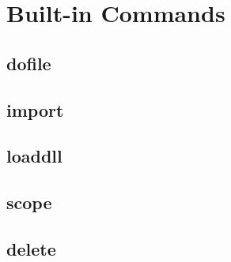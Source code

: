 \chapter{Built-in Commands}
\section{dofile}

\section{import}
\section{loaddll}
\section{scope}
\section{delete}
